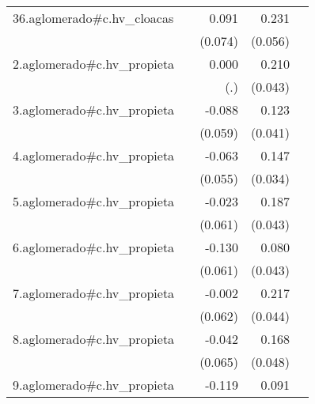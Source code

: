 {\begin{longtable}{l*{4}{D{.}{.}{-1}}}
\addlinespace
36.aglomerado#c.hv\_cloacas&                     &       0.091         &       0.231\sym{***}&                     \\
            &                     &     (0.074)         &     (0.056)         &                     \\
\addlinespace
2.aglomerado#c.hv\_propieta&                     &       0.000         &       0.210\sym{***}&                     \\
            &                     &         (.)         &     (0.043)         &                     \\
\addlinespace
3.aglomerado#c.hv\_propieta&                     &      -0.088         &       0.123\sym{**} &                     \\
            &                     &     (0.059)         &     (0.041)         &                     \\
\addlinespace
4.aglomerado#c.hv\_propieta&                     &      -0.063         &       0.147\sym{***}&                     \\
            &                     &     (0.055)         &     (0.034)         &                     \\
\addlinespace
5.aglomerado#c.hv\_propieta&                     &      -0.023         &       0.187\sym{***}&                     \\
            &                     &     (0.061)         &     (0.043)         &                     \\
\addlinespace
6.aglomerado#c.hv\_propieta&                     &      -0.130\sym{*}  &       0.080         &                     \\
            &                     &     (0.061)         &     (0.043)         &                     \\
\addlinespace
7.aglomerado#c.hv\_propieta&                     &      -0.002         &       0.217\sym{***}&                     \\
            &                     &     (0.062)         &     (0.044)         &                     \\
\addlinespace
8.aglomerado#c.hv\_propieta&                     &      -0.042         &       0.168\sym{***}&                     \\
            &                     &     (0.065)         &     (0.048)         &                     \\
\addlinespace
9.aglomerado#c.hv\_propieta&                     &      -0.119         &       0.091         &                     \\

\end{longtable}}

